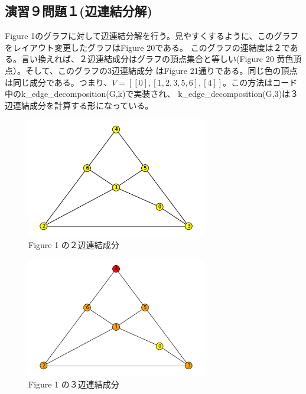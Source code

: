 \documentclass{report}
\begin{document}
\begin{CJK}{UTF8}{min}
    \section*{演習９問題１(辺連結分解)}
    Figure 1のグラフに対して辺連結分解を行う。見やすくするように、このグラフをレイアウト変更したグラフはFigure 20である。
    このグラフの連結度は２である。言い換えれば、２辺連結成分はグラフの頂点集合と等しい(Figure 20 黄色頂点）。そして、このグラフの3辺連結成分
    はFigure 21通りである。同じ色の頂点は同じ成分である。つまり、$V=[[0],[1,2,3,5,6],[4]]$。この方法はコード中のk\_edge\_decomposition(G,k)で実装され、
    k\_edge\_decomposition(G,3)は３辺連結成分を計算する形になっている。
    \begin{figure}[!h]
        \centerline{\includegraphics[width=0.7\textwidth]{data/ex-9-K-2.png}}
        \caption{Figure 1 の２辺連結成分}
    \end{figure}
    \begin{figure}[!h]
        \centerline{\includegraphics[width=0.7\textwidth]{data/ex-9-K-3.png}}
        \caption{Figure 1 の３辺連結成分}
    \end{figure}

    \clearpage

\end{CJK}
\end{document}
